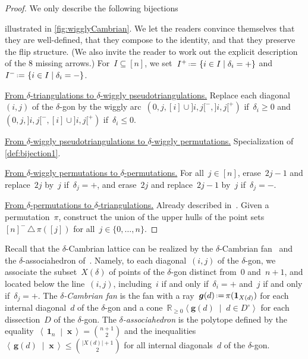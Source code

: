 \documentclass{amsart}
\theoremstyle{definition}
\newcommand{\R}{\mathbb{R}} %
\renewcommand{\b}[1]{{\boldsymbol{#1}}} %
\newcommand{\set}[2]{\left\{ #1 \;\middle|\; #2 \right\}} %
\newcommand{\setangle}[2]{\left\langle #1 \;\middle|\; #2 \right\rangle} %
\newcommand{\dotprod}[2]{\left\langle \, #1 \; \middle| \; #2 \, \right\rangle} %
\newcommand{\symdif}{\,\triangle\,} %
\newcommand{\one}{\b{1}} %
\newcommand{\eqdef}{\mbox{\,\raisebox{0.2ex}{\scriptsize\ensuremath{\mathrm:}}\ensuremath{=}\,}} %
\newcommand{\darkblue}{\color{darkblue}} %
\newcommand{\defn}[1]{\textsl{\darkblue #1}} %
\newcommand{\para}[1]{\smallskip\noindent\uline{#1.}} %
\begin{document}
\begin{proof}
We only describe the following bijections
\begin{center}
\end{center}
illustrated in \cref{fig:wigglyCambrian}.
We let the readers convince themselves that they are well-defined, that they compose to the identity, and that they preserve the flip structure. (We also invite the reader to work out the explicit description of the 8 missing arrows.)
For~$I \subseteq [n]$, we set~$I^+ \eqdef \set{i \in I}{\delta_i = {+}}$ and~$I^- \eqdef \set{i \in I}{\delta_i = {-}}$.

\para{From $\delta$-triangulations to $\delta$-wiggly pseudotriangulations}
Replace each diagonal~$(i,j)$ of the $\delta$-gon by the wiggly arc~$(0, j, [i] \cup {]i,j[}^-, {]i,j[}^+)$ if~$\delta_i \ge 0$ and~$(0, j, {]i,j[}^-, [i] \cup {]i,j[}^+)$ if~$\delta_i \le 0$.

\para{From $\delta$-wiggly pseudotriangulations to $\delta$-wiggly permutations}
Specialization of \cref{def:bijection1}.

\para{From $\delta$-wiggly permutations to $\delta$-permutations}
For all~$j \in [n]$, erase~$2j-1$ and replace~$2j$ by~$j$ if~$\delta_j = {+}$, and erase~$2j$ and replace~$2j-1$ by~$j$ if~$\delta_j = {-}$.

\para{From $\delta$-permutations to $\delta$-triangulations}
Already described in~\cite{Reading-CambrianLattices}.
Given a permutation~$\pi$, construct the union of the upper hulls of the point sets~$[n]^- \symdif \pi([j])$ for all~$j \in \{0, \dots, n\}$.
\end{proof}

Recall that the $\delta$-Cambrian lattice can be realized by the $\delta$-Cambrian fan~\cite{ReadingSpeyer} and the $\delta$-associahedron of~\cite{HohlwegLange}.
Namely, to each diagonal~$(i,j)$ of the $\delta$-gon, we associate the subset~$X(\delta)$ of points of the $\delta$-gon distinct from~$0$ and~$n+1$, and located below the line~$(i,j)$, including~$i$ if and only if~$\delta_i = {+}$ and~$j$ if and only if~$\delta_j = {+}$.
The \defn{$\delta$-Cambrian fan} is the fan with a ray~$\b{g}(d) \eqdef \pi(\one_{X(d)})$ for each internal diagonal~$d$ of the $\delta$-gon and a cone~$\R_{\ge0} \setangle{\b{g}(d)}{d \in D^\circ}$ for each dissection~$D$ of the $\delta$-gon.
The \defn{$\delta$-associahedron} is the polytope defined by the equality~$\dotprod{\one_n}{\b{x}} = \binom{n+1}{2}$ and the inequalities~$\dotprod{\b{g}(d)}{\b{x}} \le \binom{|X(d)|+1}{2}$ for all internal diagonals~$d$ of the $\delta$-gon.
\end{document}
